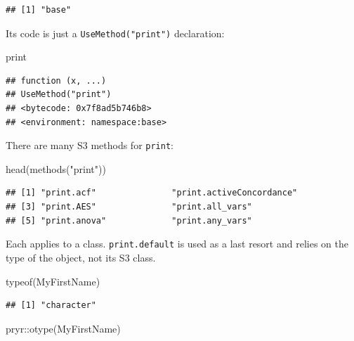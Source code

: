 \documentclass[
  12pt,
  american,
  a4paper,
  extrafontsizes,onecolumn,openright
  ]{memoir}
\newenvironment{Shaded}{\begin{snugshade}}{\end{snugshade}}
\newcommand{\FunctionTok}[1]{\textcolor[rgb]{0.00,0.00,0.00}{#1}}
\newcommand{\NormalTok}[1]{#1}
\newcommand{\SpecialCharTok}[1]{\textcolor[rgb]{0.00,0.00,0.00}{#1}}
\newcommand{\StringTok}[1]{\textcolor[rgb]{0.31,0.60,0.02}{#1}}
\begin{document}
\begin{verbatim}
## [1] "base"
\end{verbatim}

\normalsize

Its code is just a \texttt{UseMethod("print")} declaration:

\scriptsize

\begin{Shaded}
\begin{Highlighting}[]
\NormalTok{print}
\end{Highlighting}
\end{Shaded}

\begin{verbatim}
## function (x, ...) 
## UseMethod("print")
## <bytecode: 0x7f8ad5b746b8>
## <environment: namespace:base>
\end{verbatim}

\normalsize

There are many S3 methods for \texttt{print}:

\scriptsize

\begin{Shaded}
\begin{Highlighting}[]
\FunctionTok{head}\NormalTok{(}\FunctionTok{methods}\NormalTok{(}\StringTok{"print"}\NormalTok{))}
\end{Highlighting}
\end{Shaded}

\begin{verbatim}
## [1] "print.acf"               "print.activeConcordance"
## [3] "print.AES"               "print.all_vars"         
## [5] "print.anova"             "print.any_vars"
\end{verbatim}

\normalsize

Each applies to a class. \texttt{print.default} is used as a last resort and relies on the type of the object, not its S3 class.

\scriptsize

\begin{Shaded}
\begin{Highlighting}[]
\FunctionTok{typeof}\NormalTok{(MyFirstName)}
\end{Highlighting}
\end{Shaded}

\begin{verbatim}
## [1] "character"
\end{verbatim}

\begin{Shaded}
\begin{Highlighting}[]
\NormalTok{pryr}\SpecialCharTok{::}\FunctionTok{otype}\NormalTok{(MyFirstName)}
\end{Highlighting}
\end{Shaded}
\end{document}
